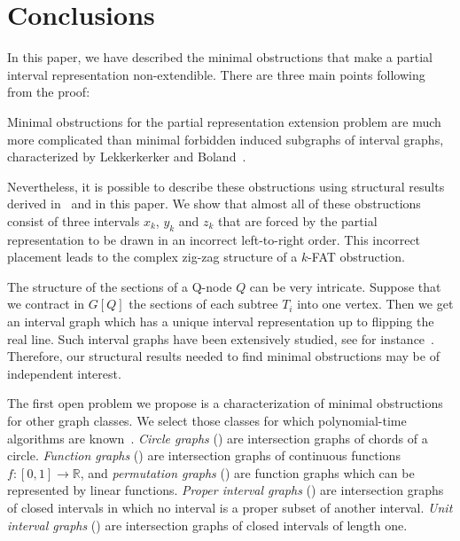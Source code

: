 \section{Conclusions} \label{sec:conclusions}

In this paper, we have described the minimal obstructions that make a partial interval representation
non-extendible. There are three main points following from the proof:

\begin{packed_enum}
\item Minimal obstructions for the partial representation extension problem are much more
complicated than minimal forbidden induced subgraphs of interval graphs, characterized by
Lekkerkerker and Boland~\cite{lb_graphs}.
\item Nevertheless, it is possible to describe these obstructions using structural results derived
in~\cite{kkosv} and in this paper. We show that almost all of these obstructions consist of three
intervals $x_k$, $y_k$ and $z_k$ that are forced by the partial representation to be drawn in an
incorrect left-to-right order. This incorrect placement leads to the complex zig-zag structure of a
$k$-FAT obstruction. 
\item The structure of the sections of a Q-node $Q$ can be very intricate. Suppose that we contract
in $G[Q]$ the sections of each subtree $T_i$ into one vertex. Then we get an interval graph which
has a unique interval representation up to flipping the real line. Such interval graphs have been
extensively studied, see for instance~\cite{hanlon,fishburn_unique,prescribed_lengths_npc}.
Therefore, our structural results needed to find minimal obstructions may be of independent
interest.
\end{packed_enum}

The first open problem we propose is a characterization of minimal obstructions for other graph
classes. We select those classes for which polynomial-time algorithms are
known~\cite{cfk,kkkw,kkorssv}.  \emph{Circle graphs} (\circle) are intersection graphs of chords of
a circle. \emph{Function graphs} (\fun) are intersection graphs of continuous functions $f : [0,1]
\to \mathbb R$, and \emph{permutation graphs} (\perm) are function graphs which can be represented
by linear functions.  \emph{Proper interval graphs} (\pint) are intersection graphs of closed
intervals in which no interval is a proper subset of another interval. \emph{Unit interval graphs}
(\uint) are intersection graphs of closed intervals of length one. 

